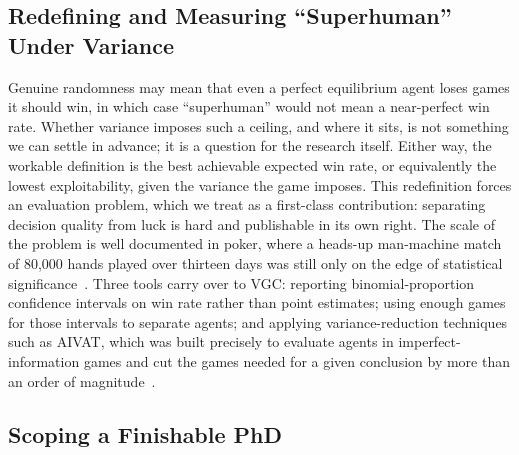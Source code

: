 \subsection{Redefining and Measuring ``Superhuman'' Under Variance}
\label{subsec:superhuman}

Genuine randomness may mean that even a perfect equilibrium agent loses games it
should win, in which case ``superhuman'' would not mean a near-perfect win rate.
Whether variance imposes such a ceiling, and where it sits, is not something we
can settle in advance; it is a question for the research itself. Either way, the
workable definition is the best achievable expected win rate, or equivalently the
lowest exploitability, given the variance the game imposes. This redefinition forces an
evaluation problem, which we treat as a first-class contribution: separating
decision quality from luck is hard and publishable in its own right. The scale of
the problem is well documented in poker, where a heads-up man-machine match of
80{,}000 hands played over thirteen days was still only on the edge of statistical
significance~\cite{burch2018aivat}. Three tools carry over to VGC: reporting
binomial-proportion confidence intervals on win rate rather than point estimates;
using enough games for those intervals to separate agents; and applying
variance-reduction techniques such as AIVAT, which was built precisely to evaluate
agents in imperfect-information games and cut the games needed for a given
conclusion by more than an order of magnitude~\cite{burch2018aivat}.

\subsection{Scoping a Finishable PhD}
\label{subsec:scoping}

